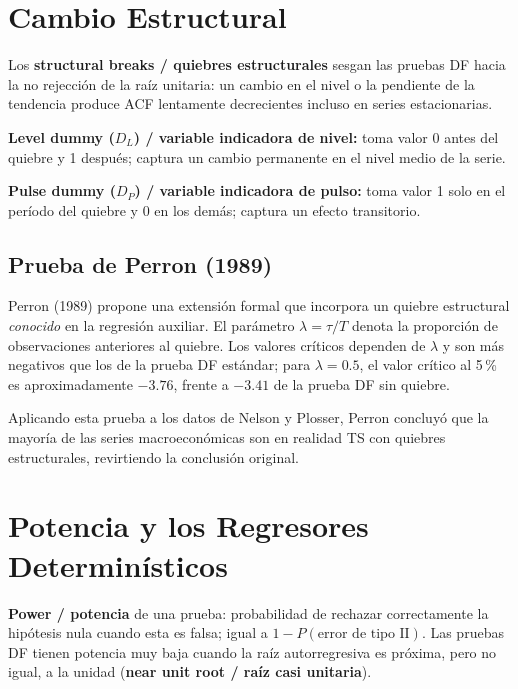 \documentclass[12pt]{article}
\begin{document}
\section{Cambio Estructural}

Los \textbf{structural breaks / quiebres estructurales} sesgan las pruebas
DF hacia la no rejecci\'on de la ra\'iz unitaria: un cambio en el nivel o
la pendiente de la tendencia produce ACF lentamente decrecientes incluso
en series estacionarias.

\textbf{Level dummy ($D_L$) / variable indicadora de nivel:} toma valor 0
antes del quiebre y 1 despu\'es; captura un cambio permanente en el nivel
medio de la serie.

\textbf{Pulse dummy ($D_P$) / variable indicadora de pulso:} toma valor 1
solo en el per\'iodo del quiebre y 0 en los dem\'as; captura un efecto
transitorio.

\subsection{Prueba de Perron (1989)}

Perron (1989) propone una extensi\'on formal que incorpora un quiebre
estructural \emph{conocido} en la regresi\'on auxiliar. El par\'ametro
$\lambda = \tau/T$ denota la proporci\'on de observaciones anteriores al
quiebre. Los valores cr\'iticos dependen de $\lambda$ y son m\'as
negativos que los de la prueba DF est\'andar; para $\lambda = 0.5$, el
valor cr\'itico al 5\,\% es aproximadamente $-3.76$, frente a $-3.41$
de la prueba DF sin quiebre.

Aplicando esta prueba a los datos de Nelson y Plosser, Perron concluy\'o
que la mayor\'ia de las series macroecon\'omicas son en realidad TS con
quiebres estructurales, revirtiendo la conclusi\'on original.

\section{Potencia y los Regresores Determin\'isticos}

\textbf{Power / potencia} de una prueba: probabilidad de rechazar
correctamente la hip\'otesis nula cuando esta es falsa; igual a
$1 - P(\text{error de tipo II})$. Las pruebas DF tienen potencia muy baja
cuando la ra\'iz autorregresiva es pr\'oxima, pero no igual, a la unidad
(\textbf{near unit root / ra\'iz casi unitaria}).
\end{document}
